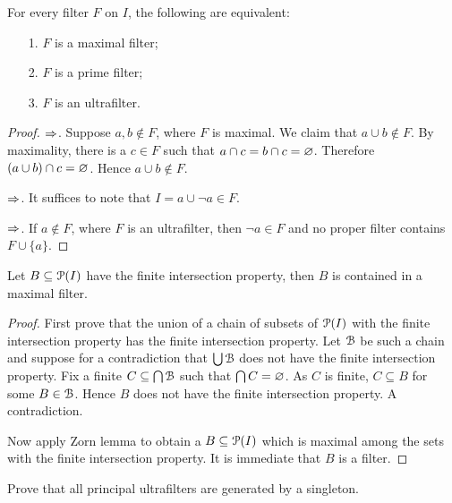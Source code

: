 \documentclass[creche.tex]{subfiles}
\begin{document}
\begin{proposition}
For every filter $F$ on $I$, the following are equivalent:
\begin{itemize}
\item[1.] $F$ is a maximal filter;
\item[2.] $F$ is a prime filter;
\item[3.] $F$ is an ultrafilter.
\end{itemize}
\end{proposition}
\begin{proof}
$\IMP$. Suppose $a,b\notin F$, where $F$ is maximal. We claim that $a\cup b\notin F$. By maximality, there is a $c\in F$ such that $a\cap c= b\cap c= \0$. Therefore $(a\cup b)\cap c= \0$. Hence  $a\cup b\notin F$. 

$\IMP$. It suffices to note that $I=a\cup \neg a\in F$. 

$\IMP$. If $a\notin F$, where $F$ is an ultrafilter, then $\neg a\in F$ and no proper filter contains $F\cup\{a\}$.
\end{proof}

\begin{proposition}\label{esistenzamassimale1}
Let $B\subseteq\P(I)$ have the finite intersection property, then $B$ is contained in a maximal filter.
\end{proposition}

\begin{proof}
First prove that the union of a chain of subsets of $\P(I)$ with the finite intersection property has the finite intersection property. Let $\B$ be such a chain and suppose for a contradiction that $\bigcup\B$ does not have the finite intersection property. Fix a finite $C\subseteq\bigcap\B$ such that $\bigcap  C=\0$. As $C$ is finite, $C\subseteq B$ for some $B\in\B$. Hence $B$ does not have the finite intersection property. A contradiction.


Now apply Zorn lemma to obtain a $B\subseteq\P(I)$ which is maximal among the sets with the finite intersection property. It is immediate that $B$ is a filter.
\end{proof}

\begin{exercise}
Prove that all principal ultrafilters are generated by a singleton.\QED
\end{exercise}



\end{document}
